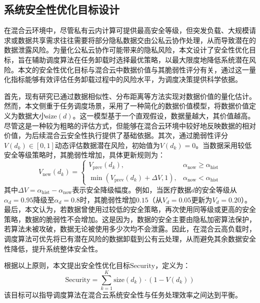 \subsection{系统安全性优化目标设计}
在混合云环境中，尽管私有云内计算可提供最高安全等级，但突发负载、大规模请求或数据共享需求往往需要将部分隐私数据交由公私云协作处理，从而导致潜在的数据泄露风险。为量化公私云协作可能带来的隐私风险，本文设计了安全性优化目标，旨在辅助调度算法在任务卸载时选择最优策略，以最大限度地降低系统潜在风险。本文的安全性优化目标与混合云中数据价值与其脆弱性评分有关，通过这一量化指标能够有效评估任务卸载过程中的风险水平，为调度决策提供科学依据。

首先，现有研究已通过数据相似性、分布距离等方法实现对数据价值的量化估计\cite{pandeyPrivacyAwareDataAcquisition2024, wangPrivacyFriendlyApproachData2023}。然而，本文侧重于任务调度场景，采用了一种简化的数据价值模型，将数据价值定义为数据大小$\text{size}(d)$。这一模型基于一个直观假设，数据量越大，其价值越高。尽管这是一种较为粗略的评估方式，但能够在混合云环境中较好地反映数据的相对价值，为后续混合云安全性执行提供了基础依据。其次，通过脆弱性评分$V(d_k) \in [0,1]$动态评估数据潜在风险，初始值为$V(d_k) = 0$。当数据采用较低安全等级策略时，其脆弱性增加，具体更新规则为：
\begin{equation}
    V_{\text{new}}(d_k) =
    \begin{cases}
        V_{\text{prev}}(d_k), & \alpha_{\text{now}} \geq \alpha_{\text{hist}} \\
        \min(V_{\text{prev}}(d_k) + \Delta V, 1), & \alpha_{\text{now}} < \alpha_{\text{hist}}
    \end{cases}
\end{equation}
其中$\Delta V = \alpha_{\text{hist}} - \alpha_{\text{now}}$表示安全降级幅度。例如，当医疗数据$d$的安全等级从$\alpha_d=0.95$降级至$\alpha_d=0.8$时，其脆弱性增加$0.15$（从$V_d=0.05$更新为$V_d=0.20$）。最后，本文认为，若数据曾使用过较低的安全策略，再次使用同等级或更高的安全策略，数据的脆弱性不会增加。这是因为，数据的安全主要由隐私加密算法保护，若算法未被攻破，数据无论被使用多少次均不会泄露。因此，在混合云高负载时，调度算法可优先将已有潜在风险的数据卸载到公有云处理，从而避免其余数据安全性降低，提升系统整体安全性。

根据以上原则，本文提出安全性优化目标$\text{Security}$，定义为：
\begin{equation}
    \text{Security} = \sum_{k=1}^K \text{size}(d_k) \cdot \left( 1 - V(d_k) \right)
    \label{eq:security}
\end{equation}
该目标可以指导调度算法在混合云系统安全性与任务处理效率之间达到平衡。

